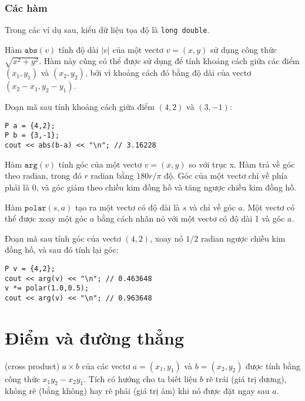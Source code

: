 \subsubsection*{Các hàm}

Trong các ví dụ sau, kiểu dữ liệu tọa độ là
\texttt{long double}.

Hàm $\texttt{abs}(v)$ tính độ dài
$|v|$ của một vectơ $v=(x,y)$
sử dụng công thức $\sqrt{x^2+y^2}$.
Hàm này cũng có thể được sử dụng để
tính khoảng cách giữa các điểm
$(x_1,y_1)$ và $(x_2,y_2)$,
bởi vì khoảng cách đó bằng độ dài
của vectơ $(x_2-x_1,y_2-y_1)$.

Đoạn mã sau tính khoảng cách
giữa điểm $(4,2)$ và $(3,-1)$:
\begin{lstlisting}
P a = {4,2};
P b = {3,-1};
cout << abs(b-a) << "\n"; // 3.16228
\end{lstlisting}

Hàm $\texttt{arg}(v)$ tính 
góc của một vectơ $v=(x,y)$ so với trục x.
Hàm trả về góc theo radian,
trong đó $r$ radian bằng $180 r/\pi$ độ.
Góc của một vectơ chỉ về phía phải là 0,
và góc giảm theo chiều kim đồng hồ và tăng 
ngược chiều kim đồng hồ.

Hàm $\texttt{polar}(s,a)$ tạo ra một vectơ
có độ dài là $s$ và chỉ về góc $a$.
Một vectơ có thể được xoay một góc $a$
bằng cách nhân nó với một vectơ có độ dài 1 và góc $a$.

Đoạn mã sau tính góc của 
vectơ $(4,2)$, xoay nó $1/2$ radian
ngược chiều kim đồng hồ, và sau đó tính lại góc:

\begin{lstlisting}
P v = {4,2};
cout << arg(v) << "\n"; // 0.463648
v *= polar(1.0,0.5);
cout << arg(v) << "\n"; // 0.963648
\end{lstlisting}

\section{Điểm và đường thẳng}


 (cross product) $a \times b$ của các vectơ
$a=(x_1,y_1)$ và $b=(x_2,y_2)$ được tính
bằng công thức $x_1 y_2 - x_2 y_1$.
Tích có hướng cho ta biết liệu $b$
rẽ trái (giá trị dương), không rẽ (bằng không)
hay rẽ phải (giá trị âm)
khi nó được đặt ngay sau $a$.

